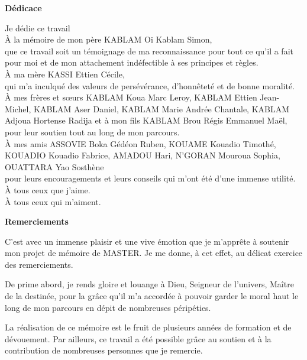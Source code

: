 \begin{center}
	\LARGE{\textbf{Dédicace}}
\end{center}

\begin{center}
	Je dédie ce travail\\
	\uppercase{à} la mémoire de mon père KABLAM Oi Kablam Simon, \\ que ce travail soit un témoignage de ma reconnaissance pour tout ce qu'il a fait pour moi et de mon attachement indéfectible à ses principes et règles. \\
	\uppercase{à} ma mère KASSI Ettien Cécile, \\ qui m'a inculqué des valeurs de persévérance, d'honnêteté et de bonne moralité. \\
	\uppercase{à} mes frères et sœurs KABLAM Koua Marc Leroy, KABLAM Ettien Jean-Michel, KABLAM Aser Daniel, KABLAM Marie Andrée Chantale, KABLAM Adjoua Hortense Radija et à mon fils KABLAM Brou Régis Emmanuel Maël, \\ pour leur soutien tout au long de mon parcours.\\
	\uppercase{à} mes amis ASSOVIE Boka Gédéon Ruben, KOUAME Kouadio Timothé, KOUADIO Kouadio Fabrice, AMADOU Hari, N'GORAN Mouroua Sophia, OUATTARA Yao Sosthène\\ pour leurs encouragements et leurs conseils qui m'ont été d'une immense utilité.\\
	\uppercase{à} tous ceux que j'aime.\\
	\uppercase{à} tous ceux qui m'aiment.
	
	
\end{center} 

\newpage
{}
\begin{center}
	\LARGE{\textbf{Remerciements}}
\end{center}
C'est avec un immense plaisir et une vive émotion que je m'apprête à soutenir mon projet de mémoire de MASTER. Je me donne, à cet effet, au délicat exercice des remerciements.

De prime abord, je rends gloire et louange à Dieu, Seigneur de l'univers, Maître de la destinée, pour la grâce qu'il m'a accordée à pouvoir garder le moral haut le long de mon parcours en dépit de nombreuses péripéties.

La réalisation de ce mémoire est le fruit de plusieurs années de formation et de dévouement. 
Par ailleurs, ce travail a été possible grâce au soutien et à la contribution de nombreuses personnes que je remercie.



